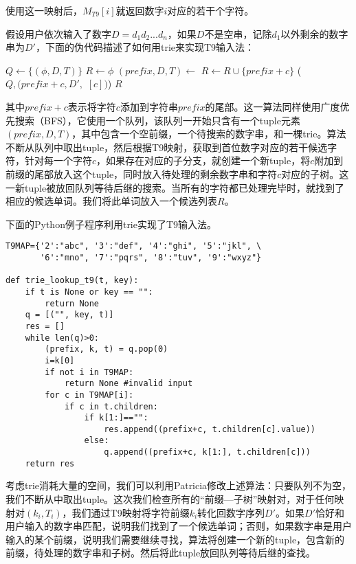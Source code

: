 \documentclass[UTF8]{article}
\begin{document}
使用这一映射后，$M_{T9}[i]$就返回数字$i$对应的若干个字符。

假设用户依次输入了数字$D = d_1d_2...d_n$，如果$D$不是空串，记除$d_1$以外剩余的数字串为$D'$，下面的伪代码描述了如何用trie来实现T9输入法：

\begin{algorithmic}[1]
  \State $Q \gets \{(\phi, D, T)\}$
  \State $R \gets \phi$
    \State $(prefix, D, T) \gets$ 
          \State $R \gets R \cup \{prefix + c\}$
        \Else
          \State {}($Q, (prefix + c, D', $ $[c])$)
        \EndIf
      \EndIf
    \EndFor
  \EndWhile
  \State \Return $R$
\EndFunction
\end{algorithmic}

其中$prefix + c$表示将字符$c$添加到字符串$prefix$的尾部。这一算法同样使用广度优先搜索（BFS），它使用一个队列，该队列一开始只含有一个tuple元素$(prefix, D, T)$，其中包含一个空前缀，一个待搜索的数字串，和一棵trie。算法不断从队列中取出tuple，然后根据T9映射，获取到首位数字对应的若干候选字符，针对每一个字符$c$，如果存在对应的子分支，就创建一个新tuple，将$c$附加到前缀的尾部放入这个tuple，同时放入待处理的剩余数字串和字符$c$对应的子树。这一新tuple被放回队列等待后继的搜索。当所有的字符都已处理完毕时，就找到了相应的候选单词。我们将此单词放入一个候选列表$R$。

下面的Python例子程序利用trie实现了T9输入法。

\lstset{language=Python}
\begin{lstlisting}
T9MAP={'2':"abc", '3':"def", '4':"ghi", '5':"jkl", \
       '6':"mno", '7':"pqrs", '8':"tuv", '9':"wxyz"}

def trie_lookup_t9(t, key):
    if t is None or key == "":
        return None
    q = [("", key, t)]
    res = []
    while len(q)>0:
        (prefix, k, t) = q.pop(0)
        i=k[0]
        if not i in T9MAP:
            return None #invalid input
        for c in T9MAP[i]:
            if c in t.children:
                if k[1:]=="":
                    res.append((prefix+c, t.children[c].value))
                else:
                    q.append((prefix+c, k[1:], t.children[c]))
    return res
\end{lstlisting}

考虑trie消耗大量的空间，我们可以利用Patricia修改上述算法：只要队列不为空，我们不断从中取出tuple。这次我们检查所有的“前缀—子树”映射对，对于任何映射对$(k_i, T_i)$，我们通过T9映射将字符前缀$k_i$转化回数字序列$D'$。如果$D'$恰好和用户输入的数字串匹配，说明我们找到了一个候选单词；否则，如果数字串是用户输入的某个前缀，说明我们需要继续寻找，算法将创建一个新的tuple，包含新的前缀，待处理的数字串和子树。然后将此tuple放回队列等待后继的查找。
\end{document}

